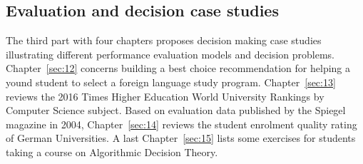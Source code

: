 % 
%
%

\begin{partbacktext}
\part{Evaluation and decision case studies}
\noindent The third part with four chapters proposes decision making case studies illustrating different performance evaluation models and decision problems. Chapter~\ref{sec:12} concerns building a best choice recommendation for helping a yound student to select a foreign language study program. Chapter~\ref{sec:13} reviews the 2016 Times Higher Education World University Rankings by Computer Science subject. Based on evaluation data published by the Spiegel magazine in 2004, Chapter~\ref{sec:14} reviews the student enrolment quality rating of German Universities. A last Chapter~\ref{sec:15} lists some exercises for students taking a course on Algorithmic Decision Theory. 
\end{partbacktext}